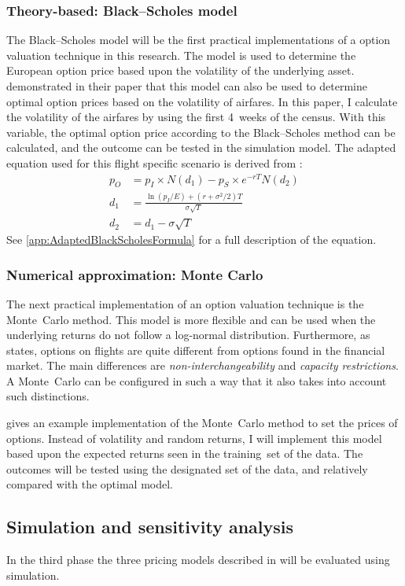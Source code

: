 \subsubsection{Theory-based: Black--Scholes model}
The Black--Scholes model will be the first practical implementations of a option valuation technique in this research. The model is used to determine the European option price based upon the volatility of the underlying asset.  demonstrated in their paper that this model can also be used to determine optimal option prices based on the volatility of airfares. In this paper, I calculate the volatility of the airfares by using the first 4~weeks of the census. With this variable, the optimal option price according to the Black--Scholes method can be calculated, and the outcome can be tested in the simulation model. The adapted equation used for this flight specific scenario is derived from :
\begin{align*}
p_O &= p_I \times N(d_1) - p_S \times e^{-rT}N(d_2) \\
d_1 &= \frac{\ln(p_I/E) + (r + \sigma^2/2)T}{\sigma \sqrt{T}} \\
d_2 &= d_1 - \sigma \sqrt{T}
\end{align*}
See \cref{app:AdaptedBlackScholesFormula} for a full description of the equation.

\subsubsection{Numerical approximation: Monte Carlo}
The next practical implementation of an option valuation technique is the Monte~Carlo method. This model is more flexible and can be used when the underlying returns do not follow a log-normal distribution. Furthermore, as  states, options on flights are quite different from options found in the financial market. The main differences are \emph{non-interchangeability} and \emph{capacity restrictions}. A Monte~Carlo can be configured in such a way that it also takes into account such distinctions.

 gives an example implementation of the Monte~Carlo method to set the prices of options. Instead of volatility and random returns, I will implement this model based upon the expected returns seen in the training~set of the data. The outcomes will be tested using the designated set of the data, and relatively compared with the optimal model.


\subsection{Simulation and sensitivity analysis}
\label{subsec:SimulationAndSensitivityAnalysis}
In the third phase the three pricing models described in  will be evaluated using simulation.


